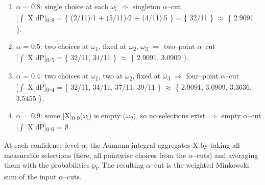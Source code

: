 \documentclass[12pt,a4paper]{report}
\numberwithin{equation}{section}
\begin{document}
\begin{enumerate}
\def\labelenumi{\arabic{enumi}.}
\item
  $\alpha$ = 0.8: single choice at each $\omega$\textsubscript{i} $\Rightarrow$ singleton $\alpha$--cut\\
  {[}$\int$ X dP{]}\textsubscript{0}.\textsubscript{8} = \{ (2/11)$\cdot$1 + (5/11)$\cdot$2 + (4/11)$\cdot$5 \} = \{ 32/11 \} $\approx$
  \{ 2.9091 \}.
\item
  $\alpha$ = 0.5: two choices at $\omega$\textsubscript{1}, fixed at $\omega$\textsubscript{2}, $\omega$\textsubscript{3} $\Rightarrow$ two--point $\alpha$--cut\\
  {[}$\int$ X dP{]}\textsubscript{0}.\textsubscript{5} = \{ 32/11, 34/11 \} $\approx$ \{ 2.9091, 3.0909 \}.
\item
  $\alpha$ = 0.4: two choices at $\omega$\textsubscript{1}, two at $\omega$\textsubscript{2}, fixed at $\omega$\textsubscript{3} $\Rightarrow$ four--point
  $\alpha$--cut\\
  {[}$\int$ X dP{]}\textsubscript{0}.\textsubscript{4} = \{ 32/11, 34/11, 37/11, 39/11 \} $\approx$ \{ 2.9091,
  3.0909, 3.3636, 3.5455 \}.
\item
  $\alpha$ = 0.9: some {[}X{]}\textsubscript{0}.\textsubscript{9}($\omega$\textsubscript{i}) is empty ($\omega$\textsubscript{2}), so no selections exist $\Rightarrow$
  empty $\alpha$--cut {[}$\int$ X dP{]}\textsubscript{0}.\textsubscript{9} = $\emptyset$.
\end{enumerate}

At each confidence level $\alpha$, the Aumann integral aggregates X by taking
all measurable selections (here, all pointwise choices from the $\alpha$--cuts)
and averaging them with the probabilities p\textsubscript{i}. The resulting $\alpha$--cut is the
weighted Minkowski sum of the input $\alpha$--cuts.
\end{document}
